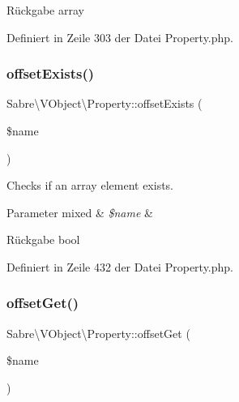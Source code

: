 \begin{DoxyReturn}{Rückgabe}
array 
\end{DoxyReturn}


Definiert in Zeile 303 der Datei Property.\+php.

\mbox{\label{class_sabre_1_1_v_object_1_1_property_a805f82e6981d54c1b2226cdef0939ff7}} 
\subsubsection{\texorpdfstring{offset\+Exists()}{offsetExists()}}
{\footnotesize\ttfamily Sabre\textbackslash{}\+V\+Object\textbackslash{}\+Property\+::offset\+Exists (\begin{DoxyParamCaption}\item[{}]{\$name }\end{DoxyParamCaption})}

Checks if an array element exists.


\begin{DoxyParams}[1]{Parameter}
mixed & {\em \$name} & \\
\hline
\end{DoxyParams}
\begin{DoxyReturn}{Rückgabe}
bool 
\end{DoxyReturn}


Definiert in Zeile 432 der Datei Property.\+php.

\mbox{\label{class_sabre_1_1_v_object_1_1_property_aa884b7a6022c1e483766f6fbe066471d}} 
\subsubsection{\texorpdfstring{offset\+Get()}{offsetGet()}}
{\footnotesize\ttfamily Sabre\textbackslash{}\+V\+Object\textbackslash{}\+Property\+::offset\+Get (\begin{DoxyParamCaption}\item[{}]{\$name }\end{DoxyParamCaption})}

